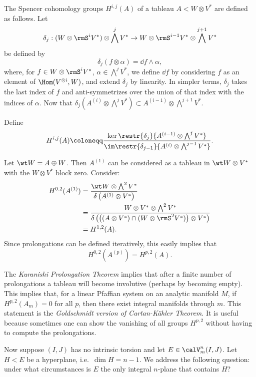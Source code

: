 \begin{defn}
    The Spencer cohomology groups $H^{i,j}(A)$ of a tableau $A<W\otimes V^\ast$ are defined as follows. Let 
    \[\delta_j:(W\otimes \rmS^iV^\ast)\otimes \bigwedge^j V^\ast\to W\otimes \rmS^{i-1}V^\ast\otimes \bigwedge^{j+1}V^\ast\]
    be defined by 
    \[\delta_j(f\otimes \alpha)=\dd f\wedge \alpha,\]
    where, for $f\in W\otimes \rmS^i V^\ast$, $\alpha\in \bigwedge^j V^\ast$, we define $\dd f$ by considering $f$ as an element of $\Hom(V^{\otimes i},W)$, and extend $\delta_j$ by linearity. In simpler terms, $\delta_j$ takes the last index of $f$ and anti-symmetrizes over the union of that index with the indices of $\alpha$. Now that $\delta_j(A^{(i)}\otimes \bigwedge^j V^\ast)\subset A^{(i-1)}\otimes\bigwedge^{j+1}V^\ast$.

    Define 
    \[H^{i,j}(A)\coloneqq \frac{\ker\restr{\delta_j}{A^{(i-1)}\otimes \bigwedge^jV^\ast}}{\im \restr{\delta_{j-1}}{A^{(i)}\otimes \bigwedge^{j-1}V^\ast}}.\]
\end{defn}

Let $\wt W=A\oplus W$. Then $A^{(1)}$ can be considered as a tableau in $\wt W\otimes V^\ast$ with the $W\otimes V^\ast$ block zero. Consider:
\begin{align}
    H^{0,2}(A^{(1)})&= \frac{\wt W\otimes \bigwedge^2 V^\ast}{\delta\left(A^{(1)}\otimes V^\ast\right)}\\
    &= \frac{W\otimes V^\ast\otimes \bigwedge^2 V^\ast}{\delta\left(\left((A\otimes V^\ast)\cap (W\otimes \rmS^2 V^\ast)\right)\otimes V^\ast\right)}\\
    &=H^{1,2}(A).
\end{align}
Since prolongations can be defined iteratively, this easily implies that 
\[H^{0,2}(A^{(p)})=H^{p,2}(A).\]

\begin{rem}
    The \emph{Kuranishi Prolongation Theorem} implies that after a finite number of prolongations a tableau will become involutive (perhaps by becoming empty). This implies that, for a linear Pfaffian system on an analytic manifold $M$, if $H^{p,2}(A_m)=0$ for all $p$, then there exist integral manifolds through $m$. This statement is the \emph{Goldschmidt version of Cartan-K\"ahler Theorem}. It is useful because sometimes one can show the vanishing of all groups $H^{p,2}$ without having to compute the prolongations.
\end{rem}

Now suppose $(I,J)$ has no intrinsic torsion and let $E\in\calV^n_m(I,J)$. Let $H<E$ be a hyperplane, i.e.\ $\dim H=n-1$. We address the following question: under what circumstances is $E$ the only integral $n$-plane that contains $H$?

